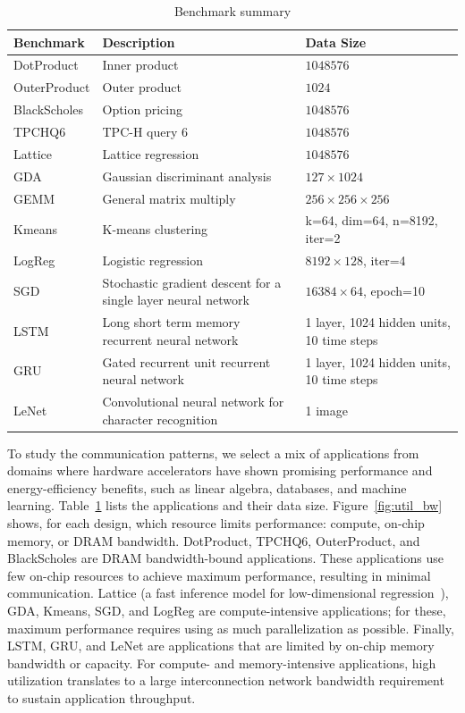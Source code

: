 \begin{table}
\centering
  \footnotesize
  \begin{tabular*}{6.25in}{p{0.75in} p{3in} p{2.5in}}
    \bottomrule
    \textbf{Benchmark} & \textbf{Description} & \textbf{Data Size} \\ \midrule
    DotProduct & Inner product & $1048576$ \\ \midrule
    OuterProduct & Outer product &$1024$ \\ \midrule
    BlackScholes & Option pricing &$1048576$ \\ \midrule
    TPCHQ6 & TPC-H query 6 &$1048576$ \\ \midrule
    Lattice & Lattice regression~\cite{garcia2009lattice} &$1048576$\\ \midrule
    GDA & Gaussian discriminant analysis &$127\times1024$ \\ \midrule
    GEMM & General matrix multiply &$256\times256\times256$ \\ \midrule
    Kmeans & K-means clustering &k=64, dim=64, n=8192, iter=2 \\ \midrule
    LogReg & Logistic regression &$8192\times128$, iter=4\\ \midrule
    SGD & Stochastic gradient descent for a single layer neural network &$16384\times64$, epoch=10 \\ \midrule
    LSTM & Long short term memory recurrent neural network &1 layer, 1024 hidden units, 10 time steps \\ \midrule
    GRU & Gated recurrent unit recurrent neural network &1 layer, 1024 hidden units, 10 time steps \\ \midrule
    LeNet & Convolutional neural network for character recognition& 1 image\\ \midrule
  \end{tabular*}
  \caption{Benchmark summary}
  \label{tab:benchmark}
\end{table}

To study the communication patterns, 
we select a mix of applications from domains where hardware accelerators have shown promising performance and energy-efficiency benefits, such as linear algebra, databases, and machine learning.
Table~\ref{tab:benchmark} lists the applications and their data size.
Figure~\ref{fig:util_bw} shows, for each design, which resource limits performance: compute, on-chip memory, or DRAM bandwidth. 
DotProduct, TPCHQ6, OuterProduct, and BlackScholes are DRAM bandwidth-bound applications. 
These applications use few on-chip resources to achieve maximum performance, resulting in minimal communication.
Lattice (a fast inference model for low-dimensional regression~\cite{garcia2009lattice}), GDA, Kmeans, SGD, and LogReg are compute-intensive applications; for these, maximum performance requires using as much parallelization as possible. 
Finally, LSTM, GRU, and LeNet are applications that are limited by on-chip memory bandwidth or capacity. 
For compute- and memory-intensive applications, high utilization translates to a large interconnection network bandwidth requirement to sustain application throughput. 

